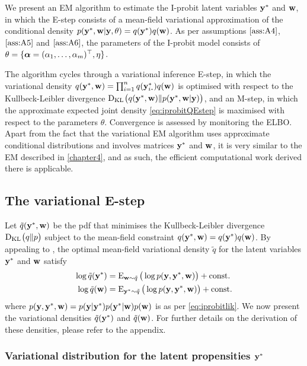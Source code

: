 We present an EM algorithm to estimate the I-probit latent variables ${\mathbf y}^*$ and ${\mathbf w}$, in which the E-step consists of a mean-field variational approximation of the conditional density $p({\mathbf y}^*,{\mathbf w}|{\mathbf y},\theta) = q({\mathbf y}^*)q({\mathbf w})$.
As per assumptions $\ref{ass:A4}$, $\ref{ass:A5}$ and $\ref{ass:A6}$, the parameters of the I-probit model consists of $\theta =\{ {\bm\alpha} = (\alpha_1,\dots,\alpha_m)^\top,\eta \}$.

The algorithm cycles through a variational inference E-step, in which the variational density $q(\by^*,\bw) = \prod_{i=1}^n q(\by^*_{i\bigcdot}) q(\bw)$ is optimised with respect to the Kullbeck-Leibler divergence $\operatorname{D_{KL}\hspace{-1pt}}\big( q({\mathbf y}^*,{\mathbf w}) \Vert p({\mathbf y}^*,{\mathbf w}|{\mathbf y}) \big)$, and an M-step, in which the approximate expected joint density \cref{eq:iprobitQEstep} is maximised with respect to the parameters $\theta$. 
Convergence is assessed by monitoring the ELBO.
Apart from the fact that the variational EM algorithm uses approximate conditional distributions and involves matrices ${\mathbf y}^*$ and ${\mathbf w}$, it is very similar to the EM described in \cref{chapter4}, and as such, the efficient computational work derived there is applicable.

\subsection{The variational E-step}

Let $\tilde q({\mathbf y}^*,{\mathbf w})$ be the pdf that minimises the Kullbeck-Leibler divergence $\operatorname{D_{KL}\hspace{-1pt}}\big( q \Vert p \big)$ subject to the mean-field constraint $q({\mathbf y}^*,{\mathbf w}) = q({\mathbf y}^*)q({\mathbf w})$.
By appealing to \citet[equation 10.9, p. 466]{bishop2006pattern}, the optimal mean-field variational density $\tilde q$ for the latent variables ${\mathbf y}^*$ and ${\mathbf w}$ satisfy
\begin{align}
  \log \tilde q({\mathbf y}^*) &= \operatorname{E}_{{\mathbf w}\sim\tilde q} \big( \log p({\mathbf y},{\mathbf y}^*,{\mathbf w}) \big) + \text{const.}\hspace{0.01em} \label{eq:logqystar} \\
  \log \tilde q({\mathbf w}) &= \operatorname{E}_{{\mathbf y}^*\sim\tilde q} \big( \log p({\mathbf y},{\mathbf y}^*,{\mathbf w}) \big) + \text{const.}\hspace{0.01em} \label{eq:logqw}
\end{align}
where $p({\mathbf y},{\mathbf y}^*,{\mathbf w}) = p({\mathbf y}|{\mathbf y}^*) p({\mathbf y}^*|{\mathbf w}) p({\mathbf w})$ is as per \cref{eq:iprobitlik}.
We now present the variational densities $\tilde q({\mathbf y}^*)$ and $\tilde q({\mathbf w})$.
For further details on the derivation of these densities, please refer to the appendix.

\subsubsection{Variational distribution for the latent propensities \texorpdfstring{${\mathbf y}^*$}{$y^*$}}


